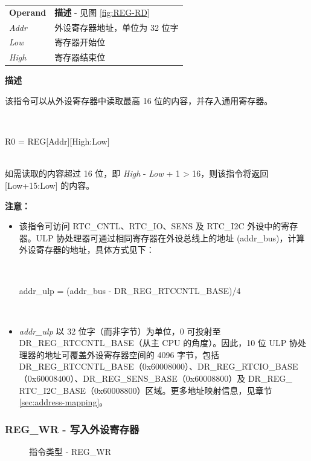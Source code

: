 \documentclass[main\_\_CN.tex]{subfiles}
\begin{document}
\vspace{-2em}
\begin{tabular}{ l l }
\textbf{Operand} & \textbf{描述} - 见图 \ref{fig:REG-RD} \\
\textit{Addr} & 外设寄存器地址，单位为 32 位字 \\
\textit{Low} & 寄存器开始位 \\
\textit{High} & 寄存器结束位
\end{tabular}

\textbf{描述}

该指令可以从外设寄存器中读取最高 16 位的内容，并存入通用寄存器。

~
\begin{centering}
    R0 = REG[Addr][High:Low] \\
\end{centering}
~\\
如需读取的内容超过 16 位，即 \textit{High} - \textit{Low} + 1 > 16，则该指令将返回 [Low+15:Low] 的内容。

\textbf{注意：}
\begin{itemize}
    \item 该指令可访问 RTC\_CNTL、RTC\_IO、SENS 及 RTC\_I2C 外设中的寄存器。ULP 协处理器可通过相同寄存器在外设总线上的地址 (addr\_bus)，计算外设寄存器的地址，具体方式见下：

    ~
    \begin{centering}
        addr\_ulp = (addr\_bus - DR\_REG\_RTCCNTL\_BASE)/4 \\
    \end{centering}
    ~

    \item \textit{addr\_ulp} 以 32 位字（而非字节）为单位，0 可投射至 DR\_REG\_RTCCNTL\_BASE（从主 CPU 的角度）。因此，10 位 ULP 协处理器的地址可覆盖外设寄存器空间的 4096 字节，包括 DR\_REG\_RTCCNTL\_BASE（0x{}60008000）、DR\_REG\_RTCIO\_BASE（0x{}60008400）、DR\_REG\_SENS\_BASE（0x{}60008800）及 DR\_REG\_\\RTC\_I2C\_BASE（0x{}60008800）区域。更多地址映射信息，见章节 \ref{sec:address-mapping}。
\end{itemize}

\subsubsection{REG\_WR - 写入外设寄存器} \label{sec:REG-WR}

%
%
%
%
%
\begin{figure}[H]
    \centering
    \caption{指令类型 - REG\_WR}
    \label{fig:REG-WR}
\end{figure}
\end{document}
